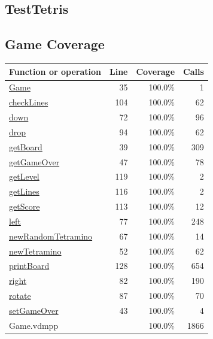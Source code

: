 \documentclass[a4paper]{article}
\begin{document}
\subsection{TestTetris}


\subsection{Game Coverage}
\begin{longtable}{|l|r|r|r|}
\hline
Function or operation & Line & Coverage & Calls \\
\hline
\hline
\hyperref[Game:35]{Game} & 35&100.0\% & 1 \\
\hline
\hyperref[checkLines:104]{checkLines} & 104&100.0\% & 62 \\
\hline
\hyperref[down:72]{down} & 72&100.0\% & 96 \\
\hline
\hyperref[drop:94]{drop} & 94&100.0\% & 62 \\
\hline
\hyperref[getBoard:39]{getBoard} & 39&100.0\% & 309 \\
\hline
\hyperref[getGameOver:47]{getGameOver} & 47&100.0\% & 78 \\
\hline
\hyperref[getLevel:119]{getLevel} & 119&100.0\% & 2 \\
\hline
\hyperref[getLines:116]{getLines} & 116&100.0\% & 2 \\
\hline
\hyperref[getScore:113]{getScore} & 113&100.0\% & 12 \\
\hline
\hyperref[left:77]{left} & 77&100.0\% & 248 \\
\hline
\hyperref[newRandomTetramino:67]{newRandomTetramino} & 67&100.0\% & 14 \\
\hline
\hyperref[newTetramino:52]{newTetramino} & 52&100.0\% & 62 \\
\hline
\hyperref[printBoard:128]{printBoard} & 128&100.0\% & 654 \\
\hline
\hyperref[right:82]{right} & 82&100.0\% & 190 \\
\hline
\hyperref[rotate:87]{rotate} & 87&100.0\% & 70 \\
\hline
\hyperref[setGameOver:43]{setGameOver} & 43&100.0\% & 4 \\
\hline
\hline
Game.vdmpp & & 100.0\% & 1866 \\
\hline
\end{longtable}
\end{document}
